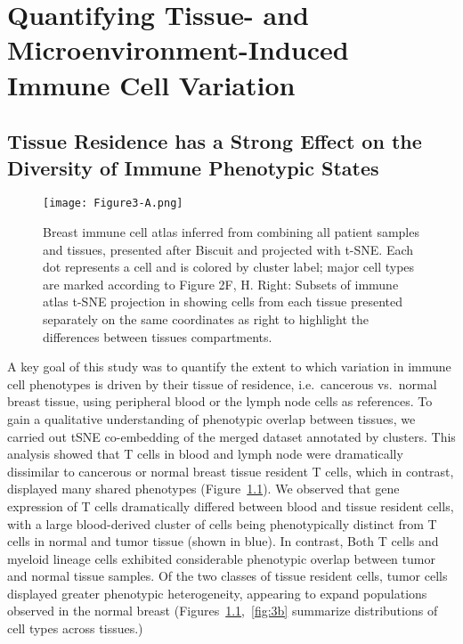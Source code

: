 
\chapter[Quantifying Tissue- and Microenvironment-Induced Immune Cell Variation][Quantifying Tissue- and Microenvironment-Induced Immune Cell Variation]{Quantifying Tissue- and Microenvironment-Induced Immune Cell Variation}


\section{Tissue Residence has a Strong Effect on the Diversity of Immune Phenotypic States}

\begin{figure}
\centering
\texttt{[image: Figure3-A.png]}
\caption{Breast immune cell atlas inferred from combining all patient samples and tissues, presented after Biscuit and projected with t-SNE\@. Each dot represents a cell and is colored by cluster label;  major cell types are marked according to Figure 2F, H. Right: Subsets of immune atlas t-SNE projection in showing cells from each tissue presented separately on the same coordinates as right to highlight the differences between tissues compartments.
}  %
\label{fig:3a}
\end{figure}

A key goal of this study was to quantify the extent to which variation in immune cell phenotypes is driven by their tissue of residence, i.e.\ cancerous vs.\ normal breast tissue, using peripheral blood or the lymph node cells as references. 
To gain a qualitative understanding of phenotypic overlap between tissues, we carried out tSNE co-embedding \citep{Maaten2008} of the merged dataset annotated by clusters.
This analysis showed that T cells in blood and lymph node were dramatically dissimilar to cancerous or normal breast tissue resident T cells, which in contrast, displayed many shared phenotypes (Figure~\ref{fig:3a}).
We observed that gene expression of T cells dramatically differed between blood and tissue resident cells, with a large blood-derived cluster of cells being phenotypically distinct from T cells in normal and tumor tissue (shown in blue).
In contrast, Both T cells and myeloid lineage cells exhibited considerable phenotypic overlap between tumor and normal tissue samples. 
Of the two classes of tissue resident cells, tumor cells displayed greater phenotypic heterogeneity, appearing to expand populations observed in the normal breast (Figures~\ref{fig:3a},~\ref{fig:3b} summarize distributions of cell types across tissues.)

